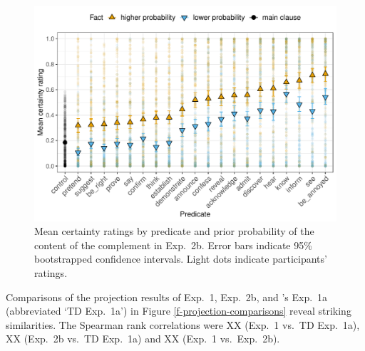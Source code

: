 \documentclass[11pt,fleqn]{article}
\newcommand{\6}{\mbox{$[\hspace*{-.6mm}[$}}
\newcommand{\9}{\mbox{$]\hspace*{-.6mm}]$}}
\newcommand{\citepos}[1]{\citeauthor{#1}'s \citeyear{#1}}
\begin{document}
\begin{figure}[h!]
\centering

\includegraphics[width=.75\paperwidth]{../../results/3-projectivity/graphs/means-projectivity-by-predicate-and-prior}

\caption{Mean certainty ratings by predicate and prior probability of the content of the complement in Exp.~2b. Error bars indicate 95\% bootstrapped confidence intervals. Light dots indicate participants' ratings.} 
\label{f-projection-mean-2b}
\end{figure}

Comparisons of the projection results of Exp.~1, Exp.~2b, and \citepos{tonhauser-degen-factive} Exp.~1a (abbreviated `TD Exp.~1a') in Figure \ref{f-projection-comparisons} reveal striking similarities. The Spearman rank correlations were XX (Exp.~1 vs.\ TD Exp.~1a), XX (Exp.~2b vs.\ TD Exp.~1a) and XX (Exp.~1 vs.\ Exp.~2b).
\end{document}
